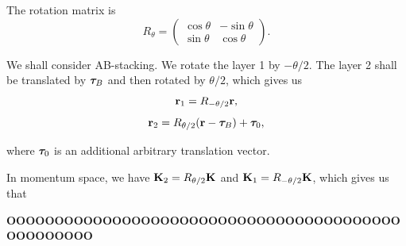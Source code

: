 \documentclass[a4paper,10pt]{article}
\begin{document}
The rotation matrix is
$$
R_\theta =
\begin{pmatrix}
\cos\theta & -\sin\theta \\
\sin\theta & \cos\theta
\end{pmatrix}.
$$

We shall consider AB-stacking. We rotate the layer 1 by $-\theta/2$. The layer 2 shall be translated by ${\bm{\tau}}_B$ and then rotated by $\theta/2$, which gives us
$$
{\vb{r}}_1 = R_{-\theta/2} {\vb{r}},
$$
$$
{\vb{r}}_2 = R_{\theta/2} ({\vb{r}} - {\bm{\tau}}_B) + {\bm{\tau}}_0,
$$

where ${\bm{\tau}}_0$ is an additional arbitrary translation vector.

\n

In momentum space, we have ${\vb{K}}_2 = R_{\theta/2} {\vb{K}}$ and ${\vb{K}}_1 = R_{-\theta/2} {\vb{K}}$, which gives us that

\n

\textbf{OOOOOOOOOOOOOOOOOOOOOOOOOOOOOOOOOOOOOOOOOOOOOOOOOO}






%


\end{document}
